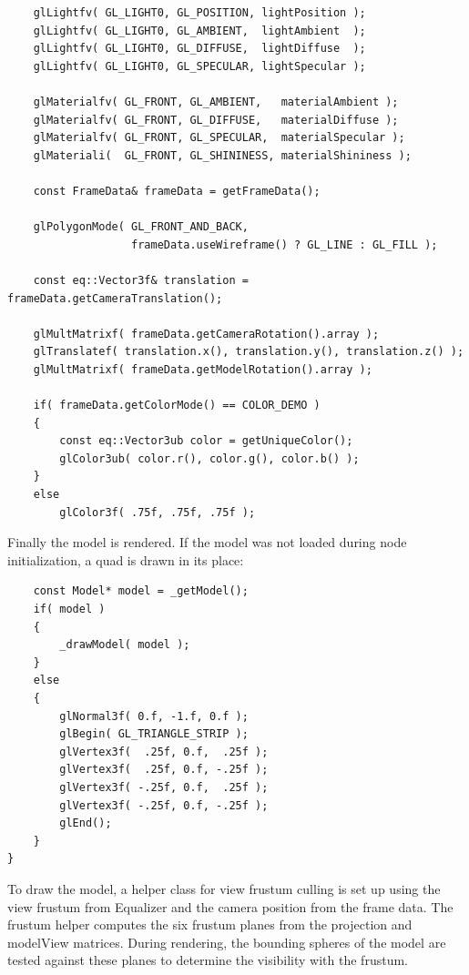 \documentclass[10pt,a4]{scrartcl}
\begin{document}
{\footnotesize\begin{lstlisting}
    glLightfv( GL_LIGHT0, GL_POSITION, lightPosition );
    glLightfv( GL_LIGHT0, GL_AMBIENT,  lightAmbient  );
    glLightfv( GL_LIGHT0, GL_DIFFUSE,  lightDiffuse  );
    glLightfv( GL_LIGHT0, GL_SPECULAR, lightSpecular );

    glMaterialfv( GL_FRONT, GL_AMBIENT,   materialAmbient );
    glMaterialfv( GL_FRONT, GL_DIFFUSE,   materialDiffuse );
    glMaterialfv( GL_FRONT, GL_SPECULAR,  materialSpecular );
    glMateriali(  GL_FRONT, GL_SHININESS, materialShininess );

    const FrameData& frameData = getFrameData();

    glPolygonMode( GL_FRONT_AND_BACK, 
                   frameData.useWireframe() ? GL_LINE : GL_FILL );

    const eq::Vector3f& translation = frameData.getCameraTranslation();

    glMultMatrixf( frameData.getCameraRotation().array );
    glTranslatef( translation.x(), translation.y(), translation.z() );
    glMultMatrixf( frameData.getModelRotation().array );

    if( frameData.getColorMode() == COLOR_DEMO )
    {
        const eq::Vector3ub color = getUniqueColor();
        glColor3ub( color.r(), color.g(), color.b() );
    }
    else
        glColor3f( .75f, .75f, .75f );
\end{lstlisting}}

Finally the model is rendered. If the model was not loaded during node
initialization, a quad is drawn in its place:

{\footnotesize\begin{lstlisting}
    const Model* model = _getModel();
    if( model )
    {
        _drawModel( model );
    }
    else
    {
        glNormal3f( 0.f, -1.f, 0.f );
        glBegin( GL_TRIANGLE_STRIP );
        glVertex3f(  .25f, 0.f,  .25f );
        glVertex3f(  .25f, 0.f, -.25f );
        glVertex3f( -.25f, 0.f,  .25f );
        glVertex3f( -.25f, 0.f, -.25f );
        glEnd();
    }
}
\end{lstlisting}}

To draw the model, a helper class for view frustum culling is set up
using the view frustum from Equalizer and the camera position from the
frame data. The frustum helper computes the six frustum planes from the
projection and modelView matrices. During rendering, the bounding
spheres of the model are tested against these planes to determine the
visibility with the frustum.
\end{document}
